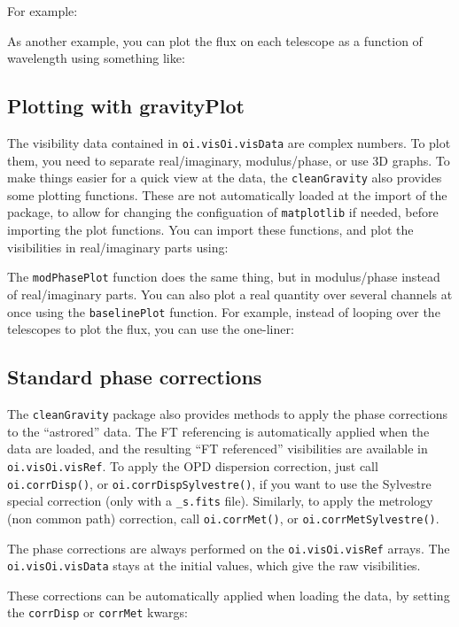 \noindent{}For example:


\noindent{}As another example, you can plot the flux on each telescope as a function of wavelength using something like:


\subsection{Plotting with gravityPlot}

The visibility data contained in \verb|oi.visOi.visData| are complex numbers. To plot them, you need to separate real/imaginary, modulus/phase, or use 3D graphs. To make things easier for a quick view at the data, the \verb|cleanGravity| also provides some plotting functions. These are not automatically loaded at the import of the package, to allow for changing the configuation of \verb|matplotlib| if needed, before importing the plot functions. You can import these functions, and plot the visibilities in real/imaginary parts using:


The \verb|modPhasePlot| function does the same thing, but in modulus/phase instead of real/imaginary parts. You can also plot a real quantity over several channels at once using the \verb|baselinePlot| function. For example, instead of looping over the telescopes to plot the flux, you can use the one-liner:



\subsection{Standard phase corrections}

The \verb|cleanGravity| package also provides methods to apply the phase corrections to the ``astrored'' data. The FT referencing is automatically applied when the data are loaded, and the resulting ``FT referenced'' visibilities are available in \verb|oi.visOi.visRef|. To apply the OPD dispersion correction, just call \verb|oi.corrDisp()|, or \verb|oi.corrDispSylvestre()|, if you want to use the Sylvestre special correction (only with a \verb|_s.fits| file). Similarly, to apply the metrology (non common path) correction, call \verb|oi.corrMet()|, or \verb|oi.corrMetSylvestre()|.

The phase corrections are always performed on the \verb|oi.visOi.visRef| arrays. The \verb|oi.visOi.visData| stays at the initial values, which give the raw visibilities.

These corrections can be automatically applied when loading the data, by setting the \verb|corrDisp| or \verb|corrMet| kwargs:


